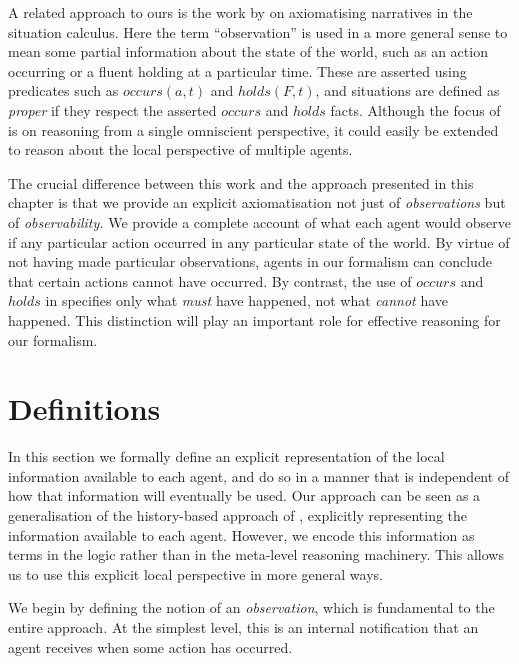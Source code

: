 A related approach to ours is the work by \citet{pinto98sc_observations}
on axiomatising narratives in the situation calculus. Here the term
{}``observation'' is used in a more general sense to mean some partial
information about the state of the world, such as an action occurring
or a fluent holding at a particular time. These are asserted using
predicates such as $occurs(a,t)$ and $holds(F,t)$, and situations
are defined as \emph{proper} if they respect the asserted $occurs$
and $holds$ facts. Although the focus of \citep{pinto98sc_observations}
is on reasoning from a single omniscient perspective, it could easily
be extended to reason about the local perspective of multiple agents.

The crucial difference between this work and the approach presented
in this chapter is that we provide an explicit axiomatisation not
just of \emph{observations} but of \emph{observability.} We provide
a complete account of what each agent would observe if any particular
action occurred in any particular state of the world. By virtue of
not having made particular observations, agents in our formalism can
conclude that certain actions cannot have occurred. By contrast, the
use of $occurs$ and $holds$ in \citep{pinto98sc_observations} specifies
only what \emph{must} have happened, not what \emph{cannot} have happened.
This distinction will play an important role for effective reasoning
for our formalism.


\section{Definitions\label{sec:Observations:Definitions}}

In this section we formally define an explicit representation of the
local information available to each agent, and do so in a manner that
is independent of how that information will eventually be used. Our
approach can be seen as a generalisation of the history-based approach
of \citep{giacomo99indigolog}, explicitly representing the information
available to each agent. However, we encode this information as terms
in the logic rather than in the meta-level reasoning machinery. This
allows us to use this explicit local perspective in more general ways.

We begin by defining the notion of an \emph{observation}, which is
fundamental to the entire approach\emph{.} At the simplest level,
this is an internal notification that an agent receives when some
action has occurred.

